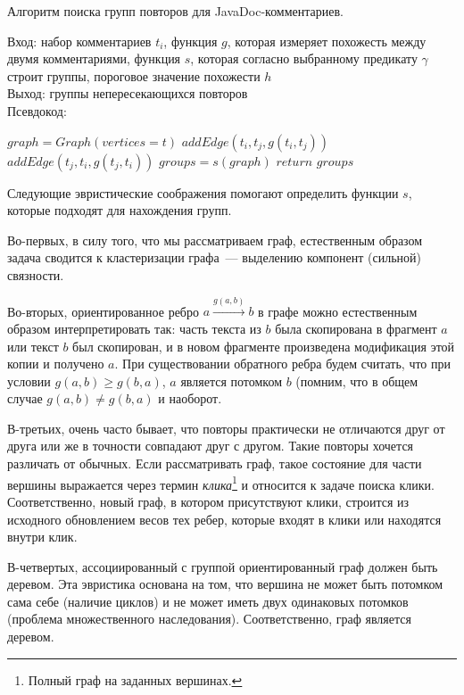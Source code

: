 \begin{algorithm}[t!]
\caption{Алгоритм поиска групп повторов для JavaDoc-комментариев.}\label{alg:groupDuplicate}
Вход: набор комментариев $t_{i}$, функция $g$, которая измеряет похожесть между двумя комментариями, функция $s$, которая согласно выбранному предикату $\gamma$ строит группы, пороговое значение похожести $h$\\
Выход: группы непересекающихся повторов\\
Псевдокод:
\begin{algorithmic}[1]
\State $graph = Graph(vertices=t)$
\State $addEdge(t_{i},t_{j},g(t_{i},t_{j}))$
\EndIf
{}
\State $addEdge(t_{j},t_{i},g(t_{j},t_{i}))$
\EndIf
\EndFor
\EndFor
\State $groups = s(graph)$
\State $return$ $groups$
\end{algorithmic}
\end{algorithm}


Следующие эвристические соображения помогают определить функции $s$, которые подходят для нахождения групп.

Во-первых, в силу того, что мы рассматриваем граф, естественным образом задача сводится к кластеризации графа~--- выделению компонент (сильной) связности.

Во-вторых, ориентированное ребро $a \xrightarrow{g(a,b)} b$ в графе можно естественным образом интерпретировать так: часть текста из $b$ была скопирована в фрагмент $a$ или текст $b$ был скопирован, и в новом фрагменте произведена модификация этой копии и получено $a$.
При существовании обратного ребра будем считать, что при условии $g(a,b)\geq g(b,a)$, $a$ является потомком $b$ (помним, что в общем случае $g(a,b)\neq g(b,a)$ и наоборот.

В-третьих, очень часто бывает, что повторы практически не отличаются друг от друга или же в точности совпадают друг с другом.
Такие повторы хочется различать от обычных.
Если рассматривать граф, такое состояние для части вершины выражается через термин \emph{клика}\footnote{Полный граф на заданных вершинах.} и относится к задаче поиска клики.
Соответственно, новый граф, в котором присутствуют клики, строится из исходного обновлением весов тех ребер, которые входят в клики или находятся внутри клик.


В-четвертых, ассоциированный с группой ориентированный граф должен быть деревом.
Эта эвристика основана на том, что вершина не может быть потомком сама себе (наличие циклов) и не может иметь двух одинаковых потомков (проблема множественного наследования).
Соответственно, граф является деревом.  

